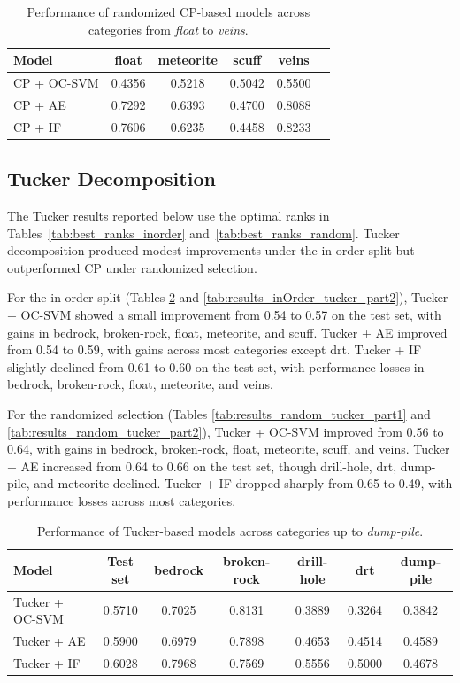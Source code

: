 \documentclass[11pt]{article}
\begin{document}
\begin{table}[h!]
\centering
\begin{tabular}{lccccc}
\hline
\textbf{Model} & \textbf{float} & \textbf{meteorite} & \textbf{scuff} & \textbf{veins} \\
\hline
CP + OC-SVM & 0.4356 & 0.5218 & 0.5042 & 0.5500 \\
CP + AE     & 0.7292 & 0.6393 & 0.4700 & 0.8088 \\
CP + IF     & 0.7606 & 0.6235 & 0.4458 & 0.8233 \\
\hline
\end{tabular}
\caption{Performance of randomized CP-based models across categories from \textit{float} to \textit{veins}.}
\label{tab:random_cp_results_part2}
\end{table}

\subsection{Tucker Decomposition}
The Tucker results reported below use the optimal ranks in Tables~\ref{tab:best_ranks_inorder} and~\ref{tab:best_ranks_random}. Tucker decomposition produced modest improvements under the in-order split but outperformed CP under randomized selection.  

For the in-order split (Tables \ref{tab:results_inOrder_tucker_part1} and \ref{tab:results_inOrder_tucker_part2}), Tucker + OC-SVM showed a small improvement from 0.54 to 0.57 on the test set, with gains in bedrock, broken-rock, float, meteorite, and scuff. Tucker + AE improved from 0.54 to 0.59, with gains across most categories except drt. Tucker + IF slightly declined from 0.61 to 0.60 on the test set, with performance losses in bedrock, broken-rock, float, meteorite, and veins.  

For the randomized selection (Tables \ref{tab:results_random_tucker_part1} and \ref{tab:results_random_tucker_part2}), Tucker + OC-SVM improved from 0.56 to 0.64, with gains in bedrock, broken-rock, float, meteorite, scuff, and veins. Tucker + AE increased from 0.64 to 0.66 on the test set, though drill-hole, drt, dump-pile, and meteorite declined. Tucker + IF dropped sharply from 0.65 to 0.49, with performance losses across most categories.  

\begin{table}[H]
\centering
\begin{tabular}{lcccccc}
\hline
\textbf{Model} & \textbf{Test set} & \textbf{bedrock} & \textbf{broken-rock} & \textbf{drill-hole} & \textbf{drt} & \textbf{dump-pile} \\
\hline
Tucker + OC-SVM & 0.5710 & 0.7025 & 0.8131 & 0.3889 & 0.3264 & 0.3842 \\
Tucker + AE     & 0.5900 & 0.6979 & 0.7898 & 0.4653 & 0.4514 & 0.4589 \\
Tucker + IF     & 0.6028 & 0.7968 & 0.7569 & 0.5556 & 0.5000 & 0.4678 \\
\hline
\end{tabular}
\caption{Performance of Tucker-based models across categories up to \textit{dump-pile}.}
\label{tab:results_inOrder_tucker_part1}
\end{table}
\end{document}
